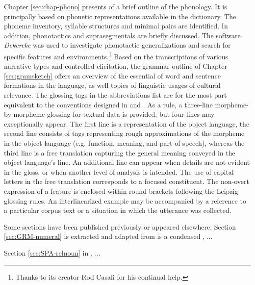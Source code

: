 Chapter  \ref{sec:chap-phono}   presents of a brief outline of the phonology. It 
is principally based on phonetic representations available in the dictionary.   
The phoneme inventory,  syllable structures and minimal pairs are identified. In 
addition, phonotactics and suprasegmentals are briefly discussed. The software 
{\it Dekereke} was used to investigate phonotactic generalizations and search 
for specific features and environments.\footnote{Thanks to its creator Rod 
Casali for his continual help.}  Based on the transcriptions of various 
narrative types and controlled elicitation, the grammar outline of Chapter 
\ref{sec:gramsketch} offers an overview of  the essential of word and sentence 
formations in the language, as well topics of linguistic usages of cultural 
relevance. The glossing tags in the abbreviations list are for the most part 
equivalent to the conventions designed in  \citet{Comr08b} and \citet{hasp14}.  
As a rule,   a three-line morpheme-by-morpheme  glossing for textual data is 
provided, but  four lines may exceptionally appear.  The first line is a 
representation of the object language, the second line consists of   tags 
representing  rough approximations  of the morpheme in the object   language 
(e.g. function, meaning,  and part-of-speech), whereas the third line is a free  
translation capturing the general meaning  conveyed in the object language's 
line. An additional line can appear when details are not evident in the gloss, 
or when another level of analysis is intended.  The use of capital letters in 
the  free translation corresponds to a focused constituent. The  non-overt 
expression of a feature is enclosed within round brackets following the   
Leipzig glossing rules. An interlinearized example  may  be accompanied by a 
reference  to a particular corpus text or  a situation in which the utterance 
was collected.


Some sections have  been published previously or appeared elsewhere. Section \ref{sec:GRM-numeral}  
is extracted and adapted from is a condensed   \citet{brin08b},  ...

Section \ref{sec:SPA-relnoun} in  \citet{Brin12},  ...
 
 
 \newpage
 